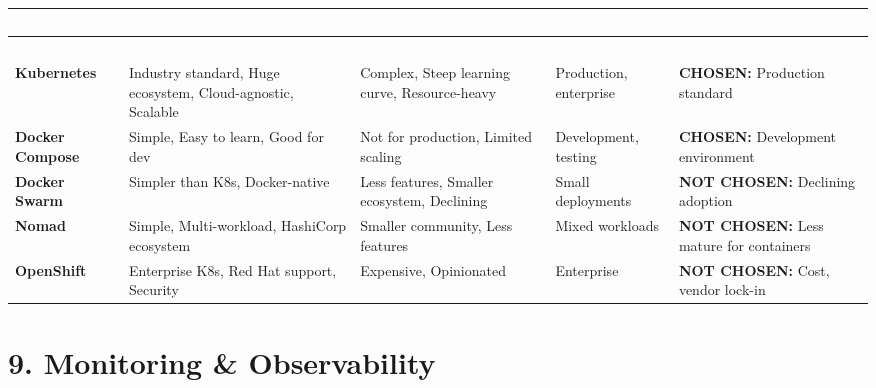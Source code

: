 \documentclass[12pt,a4paper,landscape]{article}
\begin{document}
\begin{longtable}{|p{2.5cm}|p{3cm}|p{3cm}|p{3cm}|p{4cm}|}
\hline
\rowcolor{headercolor}
\textcolor{white}{\textbf{Platform}} & 
\textcolor{white}{\textbf{Pros}} & 
\textcolor{white}{\textbf{Cons}} & 
\textcolor{white}{\textbf{Use Case}} & 
\textcolor{white}{\textbf{Why Chosen/Not}} \\
\hline
\endfirsthead

\hline
\rowcolor{headercolor}
\textcolor{white}{\textbf{Platform}} & 
\textcolor{white}{\textbf{Pros}} & 
\textcolor{white}{\textbf{Cons}} & 
\textcolor{white}{\textbf{Use Case}} & 
\textcolor{white}{\textbf{Why Chosen/Not}} \\
\hline
\endhead

\rowcolor{rowcolor1}
\textbf{Kubernetes} & 
Industry standard, Huge ecosystem, Cloud-agnostic, Scalable & 
Complex, Steep learning curve, Resource-heavy & 
Production, enterprise & 
\textbf{CHOSEN:} Production standard \\
\hline

\rowcolor{rowcolor2}
\textbf{Docker Compose} & 
Simple, Easy to learn, Good for dev & 
Not for production, Limited scaling & 
Development, testing & 
\textbf{CHOSEN:} Development environment \\
\hline

\rowcolor{rowcolor1}
\textbf{Docker Swarm} & 
Simpler than K8s, Docker-native & 
Less features, Smaller ecosystem, Declining & 
Small deployments & 
\textbf{NOT CHOSEN:} Declining adoption \\
\hline

\rowcolor{rowcolor2}
\textbf{Nomad} & 
Simple, Multi-workload, HashiCorp ecosystem & 
Smaller community, Less features & 
Mixed workloads & 
\textbf{NOT CHOSEN:} Less mature for containers \\
\hline

\rowcolor{rowcolor1}
\textbf{OpenShift} & 
Enterprise K8s, Red Hat support, Security & 
Expensive, Opinionated & 
Enterprise & 
\textbf{NOT CHOSEN:} Cost, vendor lock-in \\
\hline
\end{longtable}

\section*{9. Monitoring \& Observability}
\end{document}
